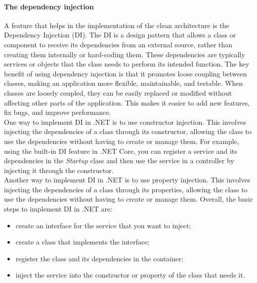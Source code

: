 \paragraph{The dependency injection}
A feature that helps in the implementation of the clean architecture is the Dependency Injection (DI). The DI is a design pattern that allows a class or component to receive its dependencies from an external source, rather than creating them internally or hard-coding them. These dependencies are typically services or objects that the class needs to perform its intended function. The key benefit of using dependency injection is that it promotes loose coupling between classes, making an application more flexible, maintainable, and testable. When classes are loosely coupled, they can be easily replaced or modified without affecting other parts of the application. This makes it easier to add new features, fix bugs, and improve performance.
\\ One way to implement DI in .NET is to use constructor injection. This involves injecting the dependencies of a class through its constructor, allowing the class to use the dependencies without having to create or manage them. For example, using the built-in DI feature in .NET Core, you can register a service and its dependencies in the \textit{Startup} class and then use the service in a controller by injecting it through the constructor.
\\ Another way to implement DI in .NET is to use property injection. This involves injecting the dependencies of a class through its properties, allowing the class to use the dependencies without having to create or manage them.
Overall, the basic steps to implement DI in .NET are:
\begin{itemize}
    \item create an interface for the service that you want to inject; 
    \item create a class that implements the interface;
    \item register the class and its dependencies in the container;
    \item inject the service into the constructor or property of the class that needs it.
\end{itemize}    

